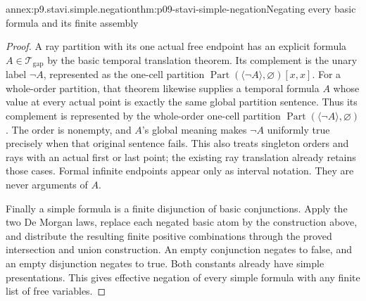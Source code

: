\begin{annexitem}{annex:p9.stavi.simple.negation}{thm:p09-stavi-simple-negation}{Negating every basic formula and its finite assembly}
\begin{proof}
A ray partition with its
one actual free endpoint
has an explicit formula
\(A\in\mathcal T_{\mathrm{gap}}\)
by the basic temporal
translation theorem.
Its complement is the
unary label \(\neg A\),
represented as the
one-cell partition
\(\operatorname{Part}(\langle\neg A\rangle,\varnothing)[x,x]\).
For a whole-order
partition, that theorem
likewise supplies a
temporal formula \(A\)
whose value at every
actual point is exactly
the same global partition
sentence. Thus its
complement is represented
by the whole-order
one-cell partition
\(\operatorname{Part}(\langle\neg A\rangle,\varnothing)\).
The order is nonempty,
and \(A\)'s global
meaning makes \(\neg A\)
uniformly true precisely
when that original
sentence fails. This
also treats singleton
orders and rays with
an actual first or last
point; the existing ray
translation already
retains those cases.
Formal infinite endpoints
appear only as interval
notation. They are never
arguments of \(A\).

Finally a simple formula
is a finite disjunction
of basic conjunctions.
Apply the two De Morgan
laws, replace each
negated basic atom by
the construction above,
and distribute the
resulting finite positive
combinations through the
proved intersection and
union construction.
An empty conjunction
negates to false, and
an empty disjunction
negates to true. Both
constants already have
simple presentations.
This gives effective
negation of every simple
formula with any finite
list of free variables.
\end{proof}
\end{annexitem}


